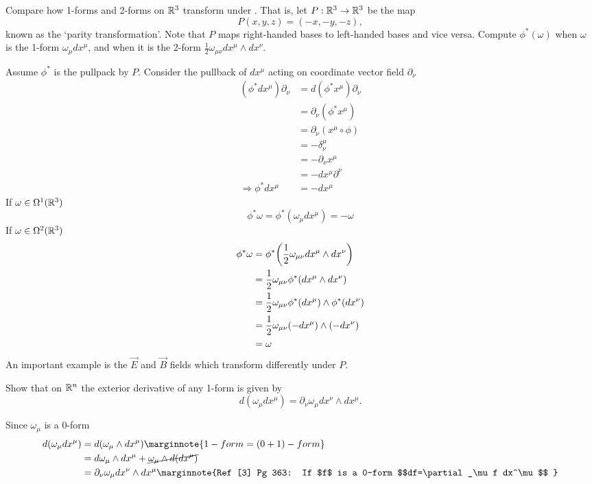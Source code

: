 \documentclass[10pt]{article}
\begin{document}
\begin{example}\label{b1e48}
	Compare how 1-forms and 2-forms on $\mathbb{R}^3$ transform under . That is, let $P:\mathbb{R}^3\to\mathbb{R}^3$ be the map
	$$
		P(x,y,z)=(-x,-y,-z),
	$$
	known as the `parity transformation'. Note that $P$ maps right-handed bases to left-handed bases and vice versa. Compute $\phi^*(\omega)$ when $\omega$ is the 1-form $\omega_\mu dx^\mu$, and when it is the 2-form $\frac12 \omega_{\mu\nu}dx^\mu \wedge dx^\nu$.
\end{example}
\sol Assume $\phi^*$ is the pullpack by $P$. Consider the pullback of $dx^\mu$ acting on coordinate vector field $\partial_\nu$
$$
\begin{aligned}
	(\phi^*dx^\mu)\partial_\nu &= d(\phi^*x^\mu)\partial_\nu\\
	&= \partial_\nu(\phi^*x^\mu)\\
	&= \partial_\nu(x^\mu \circ \phi)\\
	&= -\delta_\nu^\mu\\
	&= -\partial_\nu x^\mu\\
	&= -dx^\mu\partial^\nu\\
	\Rightarrow \phi^*dx^\mu &= -dx^\mu
\end{aligned}
$$
If $\omega \in \Omega^1(\mathbb{R}^3)$
$$
\phi^*\omega = \phi^*(\omega_\mu dx^\mu) = -\omega
$$
If $\omega \in \Omega^2(\mathbb{R}^3)$
$$
	\begin{aligned}
		\phi^*\omega &= \phi^*\p*{\frac12 \omega_{\mu\nu} dx^\mu \wedge dx^\nu}\\
		&= \frac12 \omega_{\mu\nu}\phi^*\p*{dx^\mu \wedge dx^\nu}\\
		&= \frac12 \omega_{\mu\nu}\phi^*(dx^\mu) \wedge \phi^*(dx^\nu)\\
		&= \frac12 \omega_{\mu\nu}(-dx^\mu) \wedge (-dx^\nu)\\
		&= \omega
	\end{aligned}
$$
An important example is the $\vec{E}$ and $\vec{B}$ fields which transform differently under $P$.


\begin{example}\label{b1e49}
	Show that on $\mathbb{R}^n$ the exterior derivative of any 1-form is given by
	$$
		d(\omega_\mu dx^\mu) = \partial_\nu\omega_\mu dx^\nu \wedge dx^\mu.
	$$
\end{example}
\sol Since $\omega_\mu$ is a 0-form
$$
\begin{aligned}
	d(\omega_\mu dx^\mu) &= d(\omega_\mu \wedge dx^\mu)\marginnote{1-form = (0+1)-form}\\
	&= d\omega_\mu \wedge dx^\mu + \cancel{\omega_\mu \wedge d(dx^\mu)}\\
	&= \partial_\nu\omega_\mu dx^\nu \wedge dx^\mu\marginnote{Ref [3] Pg 363: If $f$ is a 0-form $$df=\partial_\mu f dx^\mu$$ }
\end{aligned}
$$
\end{document}

